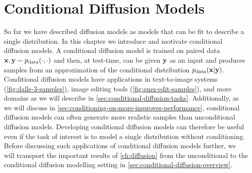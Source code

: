 \chapter{Conditional Diffusion Models} \label{ch:conditional-diffusion}

So far we have described diffusion models as models that can be fit to describe a single distribution. In this chapter we introduce and motivate conditional diffusion models. A conditional diffusion model is trained on paired data ${\mathbf{x}}, {\mathbf{y}} \sim p_\text{data}(\cdot, \cdot)$ and then, at test-time, can be given ${\mathbf{y}}$ as an input and produces samples from an approximation of the conditional distribution $p_\text{data}({\mathbf{x}}|{\mathbf{y}})$. Conditional diffusion models have applications in text-to-image systems (\cref{fig:dalle-3-samples}), image editing tools (\cref{fig:emu-edit-samples}), and more domains as we will describe in \cref{sec:conditional-diffusion-tasks}. Additionally, as we will discuss in \cref{sec:conditioning-on-more-improves-performance}, conditional diffusion models can often generate more realistic samples than unconditional diffusion models. Developing conditional diffusion models can therefore be useful even if the task of interest is to model a single distribution without conditioning. Before discussing such applications of conditional diffusion models further, we will transport the important results of \cref{ch:diffusion} from the unconditional to the conditional diffusion modelling setting in \cref{sec:conditional-diffusion-overview}.


